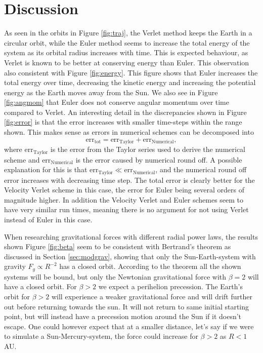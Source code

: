 \documentclass[twocolumn]{aastex62}
\begin{document}
\section{Discussion} \label{sec:discussion}
As seen in the orbits in Figure \ref{fig:traj}, the Verlet method 
keeps the Earth in a circular orbit, while the Euler method seems to 
increase the total energy of the system as its orbital radius increases 
with time. This is expected behaviour, as Verlet is known to be better
at conserving energy than Euler. This observation also consistent with 
Figure \ref{fig:energy}. This figure shows that 
Euler increases the total energy over time, decreasing the kinetic energy
and increasing the potential energy as the Earth moves away from the Sun. 
We also see in Figure \ref{fig:angmom} that Euler does not conserve angular 
momentum over time compared to Verlet.
An interesting detail in the discrepancies shown in Figure \ref{fig:error}
is that the error increases with smaller time-steps within the range 
shown. This makes sense as errors in numerical schemes can be decomposed 
into \begin{equation}
\mathrm{err}_\mathrm{tot}=\mathrm{err}_\mathrm{Taylor} + \mathrm{err}_
\mathrm{Numerical}, \label{eq:error_decomp}
\end{equation} where $\mathrm{err}_\mathrm{Taylor}$ is the error from the 
Taylor series used to derive the numerical scheme and $\mathrm{err}_
\mathrm{Numerical}$ is the error caused by numerical round off. A 
possible explanation for this is that
$\mathrm{err}_\mathrm{Taylor} \ll \mathrm{err}_\mathrm{Numerical}$, 
and the numerical round off error increases with decreasing time step. 
The total error is clearly better for the Velocity Verlet scheme in 
this case, the error for Euler being several orders of magnitude 
higher. In addition the Velocity Verlet and Euler schemes seem to have 
very similar run times, meaning there is no argument for not using 
Verlet instead of Euler in this case.

When researching gravitational forces with different radial power laws, 
the results shown Figure \ref{fig:beta} seem to be consistent with 
Bertrand's theorem as discussed in Section \ref{sec:modgrav}, 
showing that only the Sun-Earth-system with gravity $F_g\propto R^{-2}$ 
has a closed orbit. According to the theorem all the shown systems will 
be bound, but only the Newtonian gravitational force with $\beta=2$ will 
have a closed orbit. For $\beta>2$ we expect a perihelion precession. 
The Earth's orbit for $\beta>2$ will experience a  
weaker gravitational force and will drift further out before returning 
towards the sun. It will not return to same initial starting point, but 
will instead have a precession motion around the Sun if it doesn't 
escape. One could however expect that at a smaller distance, let's 
say if we were to simulate a Sun-Mercury-system, the force could increase 
for $\beta>2$ as $R<1$ AU.
\end{document}
